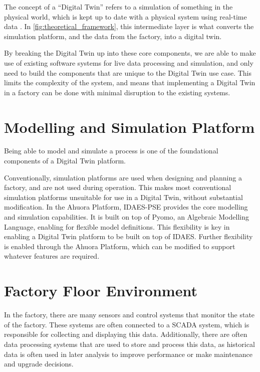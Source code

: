 The concept of a “Digital Twin” refers to a simulation of something in the physical world, which is kept up to date with a physical system using real-time data \cite{yu2022energy}.
In \cref{fig:theoretical_framework}, this intermediate layer is what converts the simulation platform, and the data from the factory, into a digital twin. 

By breaking the Digital Twin up into these core components, we are able to make use of existing software systems for live data processing and simulation, and only need to build the components that are unique to the Digital Twin use case. This limits the complexity of the system, and means that implementing a Digital Twin in a factory can be done with minimal disruption to the existing systems.


\section{Modelling and Simulation Platform}


Being able to model and simulate a process is one of the foundational components of a Digital Twin platform. 

Conventionally, simulation platforms are used when designing and planning a factory, and are not used during operation. This makes most conventional simulation platforms unsuitable for use in a Digital Twin, without substantial modification.
In the Ahuora Platform, IDAES-PSE provides the core modelling and simulation capabilities. 
It is built on top of Pyomo, an Algebraic Modelling Language, enabling for flexible model definitions.
This flexibility is key in enabling a Digital Twin platform to be built on top of IDAES. 
Further flexibility is enabled through the Ahuora Platform, which can be modified to support whatever features are required.

\section{Factory Floor Environment}

In the factory, there are many sensors and control systems that monitor the state of the factory. These systems are often connected to a SCADA system, which is responsible for collecting and displaying this data.
Additionally, there are often data processing systems that are used to store and process this data, as historical data is often used in later analysis to improve performance or make maintenance and upgrade decisions.

